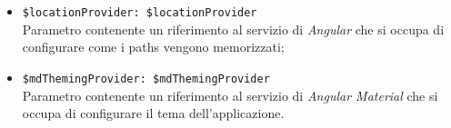 \begin{itemize}
\begin{itemize}
\begin{itemize}
				\item \texttt{\$locationProvider: \$locationProvider}\\ Parametro contenente un riferimento al servizio di \textit{Angular} che si occupa di configurare come i paths vengono memorizzati;
				\item \texttt{\$mdThemingProvider: \$mdThemingProvider}\\ Parametro contenente un riferimento al servizio di \textit{Angular Material} che si occupa di configurare il tema dell'applicazione.
			\end{itemize}
		\end{itemize}
	\end{itemize}
	
